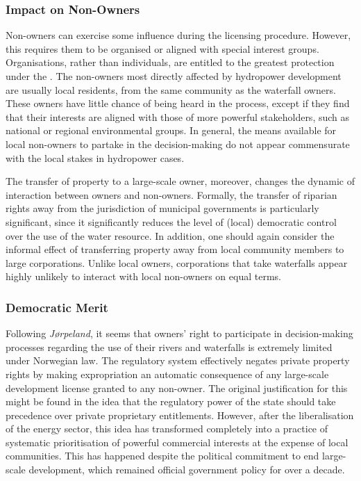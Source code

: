 \subsubsection{Impact on Non-Owners}\label{sec:5:7:8}

Non-owners can exercise some influence during the licensing procedure. However, this requires them to be organised or aligned with special interest groups. Organisations, rather than individuals, are entitled to the greatest protection under the \cite{wra17}. The non-owners most directly affected by hydropower development are usually local residents, from the same community as the waterfall owners. These owners have little chance of being heard in the process, except if they find that their interests are aligned with those of more powerful stakeholders, such as national or regional environmental groups. In general, the means available for local non-owners to partake in the decision-making do not appear commensurate with the local stakes in hydropower cases.

The transfer of property to a large-scale owner, moreover, changes the dynamic of interaction between owners and non-owners. Formally, the transfer of riparian rights away from the jurisdiction of municipal governments is particularly significant, since it significantly reduces the level of (local) democratic control over the use of the water resource. In addition, one should again consider the informal effect of transferring property away from local community members to large corporations. Unlike local owners, corporations that take waterfalls appear highly unlikely to interact with local non-owners on equal terms.


\subsubsection{Democratic Merit}\label{sec:5:7:9}

Following \emph{Jørpeland}, it seems that owners' right to participate in decision-making processes regarding the use of their rivers and waterfalls is extremely limited under Norwegian law. The regulatory system effectively negates private property rights by making expropriation an automatic consequence of any large-scale development license granted to any non-owner. The original justification for this might be found in the idea that the regulatory power of the state should take precedence over private proprietary entitlements. However, after the liberalisation of the energy sector, this idea has transformed completely into a practice of systematic prioritisation of powerful commercial interests at the expense of local communities. This has happened despite the political commitment to end large-scale development, which remained official government policy for over a decade.

